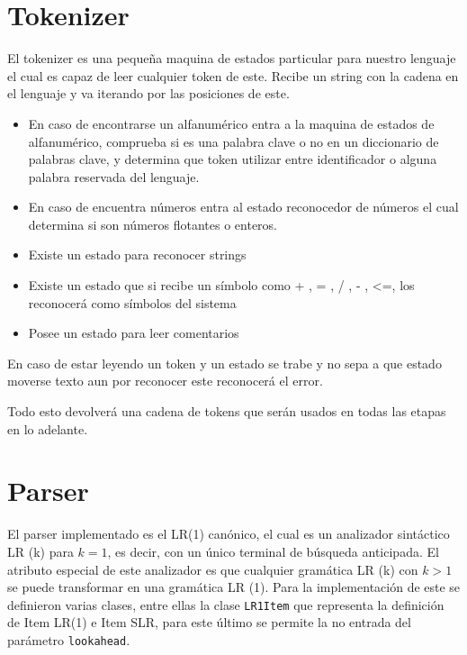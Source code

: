 \documentclass[10pt,a4paper]{article}
\begin{document}
    
\section{Tokenizer}
El tokenizer es una pequeña maquina de estados particular para nuestro lenguaje el cual es capaz de leer cualquier token de este. Recibe un string con la cadena en el lenguaje y va iterando por las posiciones de este. 

\begin{itemize}

\item En caso de encontrarse un alfanumérico entra a la maquina de estados de alfanumérico, comprueba si es una palabra clave o no en un diccionario de palabras clave, y determina que token utilizar entre identificador o alguna palabra reservada del lenguaje.

\item  En caso de encuentra números entra al estado reconocedor de números el cual determina si son números flotantes o enteros.

\item  Existe un estado para reconocer strings

\item  Existe un estado que si recibe un símbolo como { + , = , / , - , <=}, los reconocerá como símbolos del sistema

\item  Posee un estado para leer comentarios

\end{itemize}
En caso de estar leyendo un token y un estado se trabe y no sepa a que estado moverse texto aun por reconocer este reconocerá el error.

Todo esto devolverá una cadena de tokens que serán usados en todas las etapas en lo adelante.

\section{Parser}
El parser implementado es el LR(1) can\'onico, el cual es un analizador sintáctico LR (k) para $k=1$, es decir, con un único terminal de búsqueda anticipada. El atributo especial de este analizador es que cualquier gramática LR (k) con $k>1$ se puede transformar en una gramática LR (1).
		Para la implementaci\'on de este se definieron varias clases, entre ellas la clase  \texttt{LR1Item} que representa la definici\'on de Item LR(1) e Item SLR, para este \'ultimo se permite la no entrada del par\'ametro \texttt{lookahead}.
		
\end{document}
